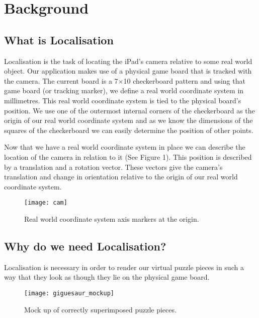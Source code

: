 \documentclass{article}
\begin{document}
\section{Background}
\subsection{What is Localisation}

Localisation is the task of locating the iPad's camera relative to some real world object. Our application makes use of a physical game board that is tracked with the camera. The current board is a 7$\times$10 checkerboard pattern and using that game board (or tracking marker), we define a real world coordinate system in millimetres. This real world coordinate system is tied to the physical board's position. We use one of the outermost internal corners of the checkerboard as the origin of our real world coordinate system and as we know the dimensions of the squares of the checkerboard we can easily determine the position of other points. \par

Now that we have a real world coordinate system in place we can describe the location of the camera in relation to it (See Figure 1). This position is described by a translation and a rotation vector. These vectors give the camera's translation and change in orientation relative to the origin of our real world coordinate system.\par 


\begin{figure}[ht]
\begin{center}
\texttt{[image: cam]} 
\caption{Real world coordinate system axis markers at the origin.}
\end{center}
\end{figure}

\subsection {Why do we need Localisation?}

Localisation is necessary in order to render our virtual puzzle pieces in such a way that they look as though they lie on the physical game board. 
\vspace*{2\baselineskip}

\begin{figure}[H]
\begin{center}
\texttt{[image: giguesaur\_mockup]} 
\caption{Mock up of correctly superimposed puzzle pieces.}
\end{center}
\end{figure}
\end{document}
